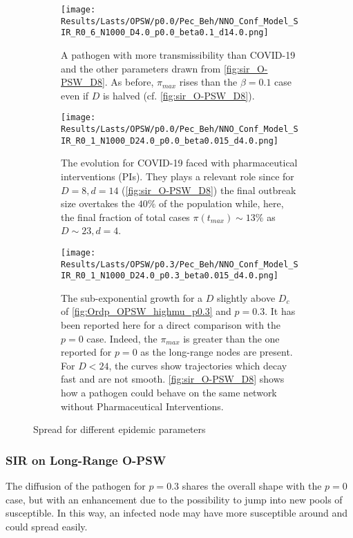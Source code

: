 \documentclass[a4paper,10pt]{book} %
\theoremstyle{definition}
\begin{document}
\begin{figure}[htbp]
	\centering
	\begin{subfigure}{\linewidth}
		\centering
		\texttt{[image: Results/Lasts/OPSW/p0.0/Pec\_Beh/NNO\_Conf\_Model\_SIR\_R0\_6\_N1000\_D4.0\_p0.0\_beta0.1\_d14.0.png]}
		\caption{A pathogen with more transmissibility than COVID-19 and the other parameters drawn from \autoref{fig:sir_O-PSW_D8}. As before, $\pi_{max}$ rises than the $ \beta = 0.1$ case even if $ D$ is halved (cf. \autoref{fig:sir_O-PSW_D8}).}
		\label{fig:sir_O-PSW_D4_d14_b0.1}
	\end{subfigure}
	\vfill
	\begin{subfigure}[t]{\linewidth}
		\centering
		\texttt{[image: Results/Lasts/OPSW/p0.0/Pec\_Beh/NNO\_Conf\_Model\_SIR\_R0\_1\_N1000\_D24.0\_p0.0\_beta0.015\_d4.0.png]}
		\caption{The evolution for COVID-19 faced with pharmaceutical interventions (PIs). They plays a relevant role since for $ D = 8, d = 14$ (\autoref{fig:sir_O-PSW_D8}) the final outbreak size overtakes the $40 \% $ of the population while, here, the final fraction of total cases $\pi(t_{max})\sim 13\%$ as $D \sim 23, d = 4$.}
		\label{fig:sir_O-PSW_D24_d4}
	\end{subfigure}
	\vfill
	\begin{subfigure}{\linewidth}
		\centering
		\texttt{[image: Results/Lasts/OPSW/p0.3/Pec\_Beh/NNO\_Conf\_Model\_SIR\_R0\_1\_N1000\_D24.0\_p0.3\_beta0.015\_d4.0.png]}
		\caption{The sub-exponential growth for a $D$ slightly above $D_c$ of \autoref{fig:Ordp_OPSW_highmu_p0.3} and $p = 0.3.$ It has been reported here for a direct comparison with the $p = 0$ case. Indeed, the $ \pi_{max} $ is greater than the one reported for $ p= 0$ as the long-range nodes are present. For $ D < 24$, the curves show trajectories which decay fast and are not smooth. \autoref{fig:sir_O-PSW_D8} shows how a pathogen could behave on the same network without Pharmaceutical Interventions.}
		\label{fig:sir_O-PSW_D24_d4_p0.3}
	\end{subfigure}
	\caption{Spread for different epidemic parameters}
	\label{fig:OPSW_COVID_p0.3}
\end{figure}

\clearpage
\subsubsection*{SIR on Long-Range O-PSW}
The diffusion of the pathogen for $p = 0.3$ shares the overall shape with the $p = 0$ case, but with an enhancement due to the possibility to jump into new pools of susceptible. In this way, an infected node may have more susceptible around and could spread easily.
\end{document}
